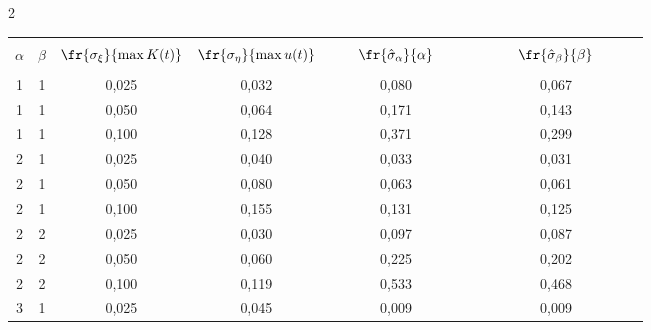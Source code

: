 \begin{multicols}{2}
\begin{table}
\begin{center}
{\label{t1us}}


\vspace*{2ex}





\tabcolsep=13pt


\begin{tabular}{|c|c|c|c|c|c|}


\hline&&&&&\\[-9pt]


$\alpha$&$\beta$&$\fr{\sigma_\xi}{\max K(t)}$&$\fr{\sigma_\eta}{\max u(t)}$&


$\ \ \ \ \ \ \fr{\hat\sigma_\alpha}{\alpha}\ \  \ \ \ \ $&\ \ \ \ \ \  $\fr{ \hat\sigma_\beta}{\beta}$\ \ \  \ \ \ \\


&&&&&\\[-9pt]


\hline




1&1&0,025&0,032&0,080&0,067\\




1&1&0,050&0,064&0,171&0,143\\




1&1&0,100&0,128&0,371&0,299\\




2&1&0,025&0,040&0,033&0,031\\




2&1&0,050&0,080&0,063&0,061\\




2&1&0,100&0,155&0,131&0,125\\




2&2&0,025&0,030&0,097&0,087\\




2&2&0,050&0,060&0,225&0,202\\




2&2&0,100&0,119&0,533&0,468\\




3&1&0,025&0,045&0,009&0,009\\





\end{tabular}
\end{center}
\end{table}
\end{multicols}
